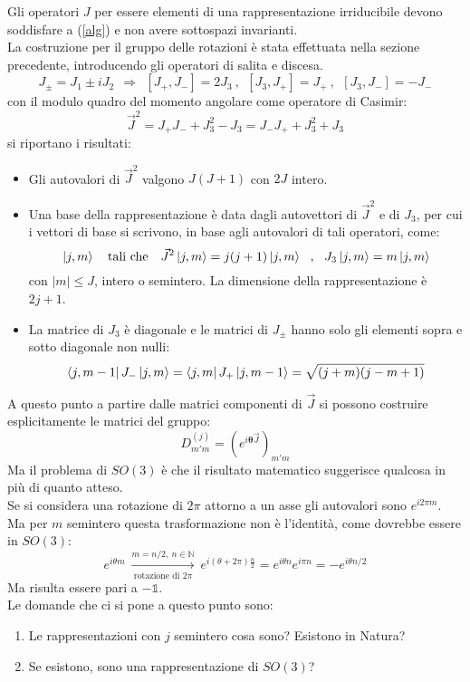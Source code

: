 \documentclass[twoside]{article}
\begin{document}
Gli operatori $J$ per essere elementi di una rappresentazione irriducibile devono soddisfare a (\ref{alg}) e non avere sottospazi invarianti.
\\
La costruzione per il gruppo delle rotazioni è stata effettuata nella sezione precedente, introducendo gli operatori di salita e discesa.
\begin{equation}
    J_{\pm}=J_1\pm i J_2 \ \ \Rightarrow \ \ [J_+,J_-]=2J_3 \ , \ \ [J_3,J_+]=J_+ \ , \ \ [J_3,J_-]=-J_-
\end{equation}
con il modulo quadro del momento angolare come operatore di Casimir:
\begin{equation}
    \Vec{J}^2=J_+J_-+J_3^2-J_3=J_-J_++J_3^2+J_3
\end{equation}
si riportano i risultati:
\begin{itemize}
    \item Gli autovalori di $\Vec{J}^2$ valgono $J(J+1)$ con $2J$ intero.
    \item Una base della rappresentazione è data dagli autovettori di $\Vec{J}^2$ e di $J_3$, per cui i vettori di base si scrivono, in base agli autovalori di tali operatori, come:
    \begin{equation}
        \ket{j,m} \ \ \ \text{tali che} \ \ \ \Vec{J}^2\ket{j,m}=j(j+1)\ket{j,m} \ \ , \ \ J_3\ket{j,m}=m\ket{j,m}
    \end{equation}
    con $|m|\le J$, intero o semintero. La dimensione della rappresentazione è $2j+1$.
    \item La matrice di $J_3$ è diagonale e le matrici di $J_{\pm}$ hanno solo gli elementi sopra e sotto diagonale non nulli:
    \begin{equation}
        \bra{j,m-1}J_-\ket{j,m}=\bra{j,m}J_+\ket{j,m-1}=\sqrt{(j+m)(j-m+1)}
    \end{equation}
\end{itemize}
A questo punto a partire dalle matrici componenti di $\Vec{J}$ si possono costruire esplicitamente le matrici del gruppo:
\begin{equation}
    D_{m'm}^{(j)}=(e^{i\bm{\theta}\Vec{J}})_{m'm}
\end{equation}
Ma il problema di $SO(3)$ è che il risultato matematico suggerisce qualcosa in più di quanto atteso.
\\
Se si considera una rotazione di $2\pi$ attorno a un asse gli autovalori sono $e^{i2\pi m}$.
\\
Ma per $m$ semintero questa trasformazione non è l'identità, come dovrebbe essere in $SO(3)$:
\begin{equation}
    e^{i\theta m} \ \xrightarrow[\text{rotazione di $2\pi$}]{m=n/2, \ n\in \mathds{N}} \ e^{i(\theta + 2\pi)\frac{n}{2}}=e^{i\theta n}e^{i\pi n}=-e^{i\theta n/2}
\end{equation}
Ma risulta essere pari a $-\mathds{1}$.
\\
Le domande che ci si pone a questo punto sono:
\begin{enumerate}
    \item Le rappresentazioni con $j$ semintero cosa sono? Esistono in Natura?
    \item Se esistono, sono una rappresentazione di $SO(3)$?
\end{enumerate}
\end{document}
